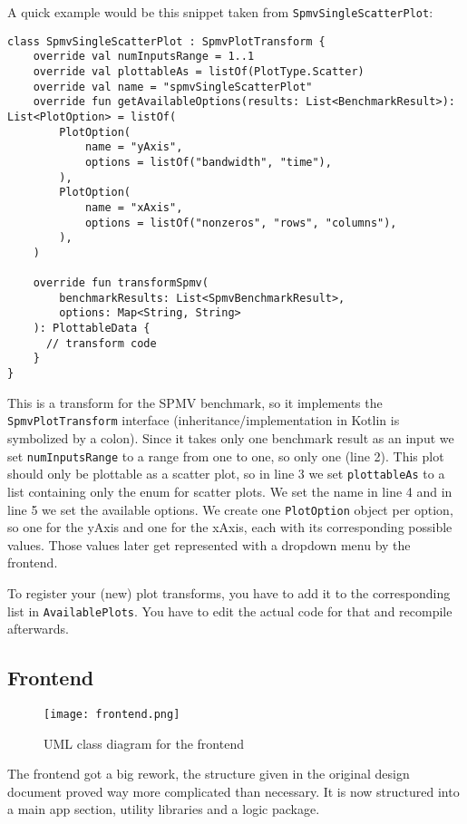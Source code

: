 A quick example would be this snippet taken from \texttt{SpmvSingleScatterPlot}:

\begin{lstlisting}[style=JAVA]
class SpmvSingleScatterPlot : SpmvPlotTransform {
    override val numInputsRange = 1..1
    override val plottableAs = listOf(PlotType.Scatter)
    override val name = "spmvSingleScatterPlot"
    override fun getAvailableOptions(results: List<BenchmarkResult>): List<PlotOption> = listOf(
        PlotOption(
            name = "yAxis",
            options = listOf("bandwidth", "time"),
        ),
        PlotOption(
            name = "xAxis",
            options = listOf("nonzeros", "rows", "columns"),
        ),
    )

    override fun transformSpmv(
        benchmarkResults: List<SpmvBenchmarkResult>,
        options: Map<String, String>
    ): PlottableData {
      // transform code
    }
}
\end{lstlisting}

This is a transform for the SPMV benchmark, so it implements the \texttt{SpmvPlotTransform} interface (inheritance/implementation in Kotlin is symbolized by a colon). Since it takes only one benchmark result as an input we set \texttt{numInputsRange} to a range from one to one, so only one (line 2). This plot should only be plottable as a scatter plot, so in line 3 we set \texttt{plottableAs} to a list containing only the enum for scatter plots. We set the name in line 4 and in line 5 we set the available options. We create one \texttt{PlotOption} object per option, so one for the yAxis and one for the xAxis, each with its corresponding possible values. Those values later get represented with a dropdown menu by the frontend.

To register your (new) plot transforms, you have to add it to the corresponding list in \texttt{AvailablePlots}. You have to edit the actual code for that and recompile afterwards.

\subsection{Frontend}

\begin{figure}[H]
	\centering
	\texttt{[image: frontend.png]}
	\caption{UML class diagram for the frontend}
  \label{fig:frontend-class}
\end{figure}
The frontend got a big rework, the structure given in the original design document proved way more complicated than necessary. It is now structured into a main app section, utility libraries and a logic package.


